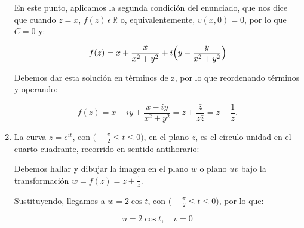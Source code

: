 \begin{enumerate}
    En este punto, aplicamos la segunda condición del enunciado, que nos dice que cuando $z=x$, $f(z)\,\epsilon\,\mathbb{R}$ o, equivalentemente,
    $v(x,0) = 0$, por lo que $C = 0$ y:


    \begin{equation*}
        f(z) = x + \frac{x}{x^2+y^2} + i \Bigl(y - \frac{y}{x^2+y^2}\Bigr)
    \end{equation*}

    Debemos dar esta solución en términos de z, por lo que reordenando términos y operando:


    \begin{equation*}
        f(z) = x + i y + \frac{x - iy}{x^2+y^2} = z + \frac{\bar{z}}{z\bar{z}} = z + \frac{1}{z}.
    \end{equation*}


    \vspace{20px}
    \item La curva $z = e^{it}$, con $\bigl(- \frac{\pi}{2} \leq t \leq 0 \bigr)$, en el plano $z$, es
    el círculo unidad en el cuarto cuadrante, recorrido en sentido antihorario:

    \begin{center}
    \end{center}

    Debemos hallar y dibujar la imagen en el plano $w$ o plano $uv$ bajo la transformación $w= f(z) = z + \frac{1}{z}$.

    Sustituyendo, llegamos a $w = 2 \cos{t} $, con $\bigl(- \frac{\pi}{2} \leq t \leq 0 \bigr)$, por lo que:

    \begin{equation*}
       u = 2 \cos{t},\hspace{12pt} v = 0
    \end{equation*}


\end{enumerate}

